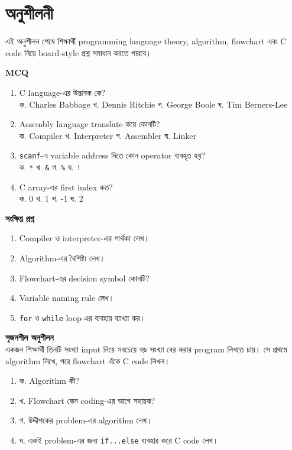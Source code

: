\section{অনুশীলনী}

\begin{learningbox}
এই অনুশীলন শেষে শিক্ষার্থী programming language theory, algorithm, flowchart এবং C code নিয়ে board-style প্রশ্ন সমাধান করতে পারবে।
\end{learningbox}

\begin{practicebox}
\textbf{MCQ}
\begin{enumerate}
\item C language-এর উদ্ভাবক কে?\\
ক. Charles Babbage \quad খ. Dennis Ritchie \quad গ. George Boole \quad ঘ. Tim Berners-Lee
\item Assembly language translate করে কোনটি?\\
ক. Compiler \quad খ. Interpreter \quad গ. Assembler \quad ঘ. Linker
\item \texttt{scanf}-এ variable address দিতে কোন operator ব্যবহৃত হয়?\\
ক. \texttt{*} \quad খ. \texttt{\&} \quad গ. \texttt{\%} \quad ঘ. \texttt{!}
\item C array-এর first index কত?\\
ক. 0 \quad খ. 1 \quad গ. -1 \quad ঘ. 2
\end{enumerate}
\end{practicebox}

\begin{practicebox}
\textbf{সংক্ষিপ্ত প্রশ্ন}
\begin{enumerate}
\item Compiler ও interpreter-এর পার্থক্য লেখ।
\item Algorithm-এর বৈশিষ্ট্য লেখ।
\item Flowchart-এর decision symbol কোনটি?
\item Variable naming rule লেখ।
\item \texttt{for} ও \texttt{while} loop-এর ব্যবহার ব্যাখ্যা কর।
\end{enumerate}
\end{practicebox}

\begin{practicebox}
\textbf{সৃজনশীল অনুশীলন}\\
একজন শিক্ষার্থী তিনটি সংখ্যা input নিয়ে সবচেয়ে বড় সংখ্যা বের করার program লিখতে চায়। সে প্রথমে algorithm লিখে, পরে flowchart এঁকে C code লিখল।
\begin{enumerate}
\item ক. Algorithm কী?
\item খ. Flowchart কেন coding-এর আগে সহায়ক?
\item গ. উদ্দীপকের problem-এর algorithm লেখ।
\item ঘ. একই problem-এর জন্য \texttt{if...else} ব্যবহার করে C code লেখ।
\end{enumerate}
\end{practicebox}

